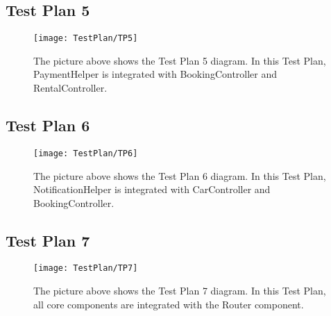 \subsection{Test Plan 5}
\blindtext
\begin{figure}[H]
	\centering
	\texttt{[image: TestPlan/TP5]}
	\caption[Test Plan 5 diagram]{The picture above shows the Test Plan 5 diagram. In this Test Plan, PaymentHelper is integrated with BookingController and RentalController.}
	\label{fig:TestPlan-5}
\end{figure}

\subsection{Test Plan 6}
\blindtext
\begin{figure}[H]
	\centering
	\texttt{[image: TestPlan/TP6]}
	\caption[Test Plan 6 diagram]{The picture above shows the Test Plan 6 diagram. In this Test Plan, NotificationHelper is integrated with CarController and BookingController.}
	\label{fig:TestPlan-6}
\end{figure}

\subsection{Test Plan 7}
\blindtext
\begin{figure}[H]
	\centering
	\texttt{[image: TestPlan/TP7]}
	\caption[Test Plan 7 diagram]{The picture above shows the Test Plan 7 diagram. In this Test Plan, all core components are integrated with the Router component.}
	\label{fig:TestPlan-7}
\end{figure}